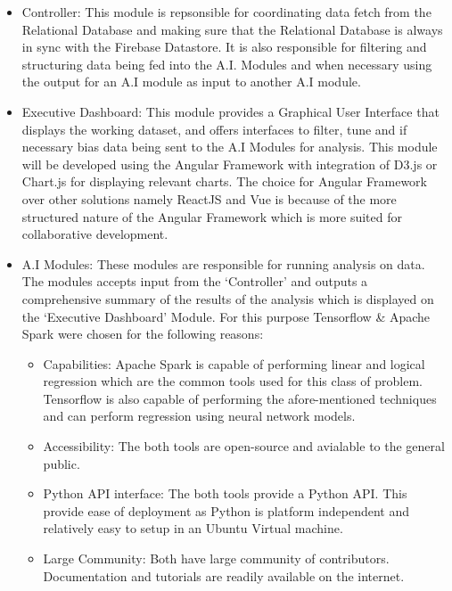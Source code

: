 \documentclass{report}
\begin{document}
    \begin{itemize}
        \item {Controller}: This module is repsonsible for coordinating data fetch from the Relational Database and making sure 
        that the Relational Database is always in sync with the Firebase Datastore. It is also responsible for filtering
        and structuring data being fed into the A.I. Modules and when necessary using the output for an A.I module as input to
        another A.I module. 
        \item{Executive Dashboard}: This module provides a Graphical User Interface that displays the working dataset, and 
        offers interfaces to filter, tune and if necessary bias data being sent to the A.I Modules for analysis. This module will
        be developed using the Angular Framework with integration of D3.js or Chart.js for displaying relevant charts. The choice 
        for Angular Framework over other solutions namely ReactJS and Vue is because of the more structured nature of the 
        Angular Framework which is more suited for collaborative development. 
        \item{A.I Modules}: These modules are responsible for running analysis on data. The modules accepts input from the 
        `Controller' and outputs a comprehensive summary of the results of the analysis which is displayed on the 
        `Executive Dashboard' Module. For this purpose Tensorflow \& Apache Spark were chosen for the following reasons:
        \begin{itemize}
            \item{Capabilities}: Apache Spark is capable of performing linear and logical regression which are the common tools
            used for this class of problem. Tensorflow is also capable of performing the afore-mentioned techniques and can 
            perform regression using neural network models.  
            \item {Accessibility}: The both tools are open-source and avialable to the general public.
            \item {Python API interface}: The both tools provide a Python API. This provide ease of deployment as Python is 
            platform independent and relatively easy to setup in an Ubuntu Virtual machine. 
            \item{Large Community}: Both have large community of contributors. Documentation and tutorials are readily available 
            on the internet. 
        \end{itemize}

\end{itemize}
\end{document}
